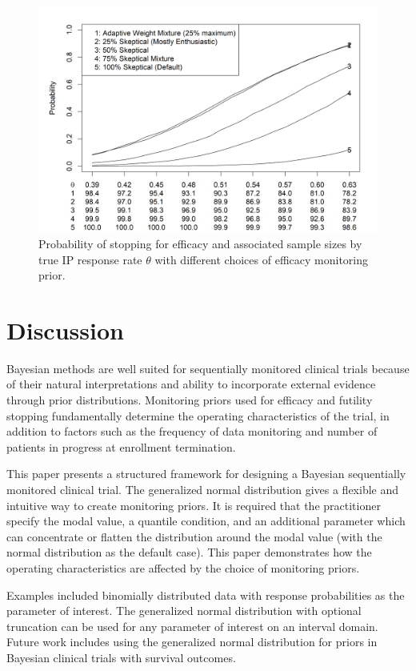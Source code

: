 \documentclass[useAMS,usenatbib,referee]{biom}
\begin{document}
\begin{figure}\begin{center}
    \centering\includegraphics[width=6in]{../00-paper/FIGURES/figure6.png}
    \caption{Probability of stopping for efficacy and associated sample sizes by true IP response rate $\theta$ with different choices of efficacy monitoring prior.}
\label{fig:ex2varyomega}
 \end{center}
\end{figure}
\section{Discussion}
Bayesian methods are well suited for sequentially monitored clinical trials because of their natural interpretations and ability to incorporate external evidence through prior distributions. Monitoring priors used for efficacy and futility stopping fundamentally determine the operating characteristics of the trial, in addition to factors such as the frequency of data monitoring and number of patients in progress at enrollment termination. 

This paper presents a structured framework for designing a Bayesian sequentially monitored clinical trial. The generalized normal distribution gives a flexible and intuitive way to create monitoring priors. It is required that the practitioner specify the modal value, a quantile condition, and an additional parameter which can concentrate or flatten the distribution around the modal value (with the normal distribution as the default case). This paper demonstrates how the operating characteristics are affected by the choice of monitoring priors.
 

Examples included binomially distributed data with response probabilities as the parameter of interest. The generalized normal distribution with optional truncation can be used for any parameter of interest on an interval domain. Future work includes using the generalized normal distribution for priors in Bayesian clinical trials with survival outcomes.
\end{document}

